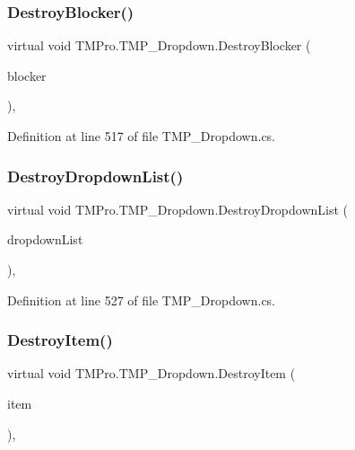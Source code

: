 \subsubsection{\texorpdfstring{DestroyBlocker()}{DestroyBlocker()}}
{\footnotesize\ttfamily virtual void T\+M\+Pro.\+T\+M\+P\+\_\+\+Dropdown.\+Destroy\+Blocker (\begin{DoxyParamCaption}\item[{Game\+Object}]{blocker }\end{DoxyParamCaption})\hspace{0.3cm}{\ttfamily [protected]}, {\ttfamily [virtual]}}



Definition at line 517 of file T\+M\+P\+\_\+\+Dropdown.\+cs.

\mbox{\label{class_t_m_pro_1_1_t_m_p___dropdown_adf7f42bd73c1274367a38b60596f4645}} 
\subsubsection{\texorpdfstring{DestroyDropdownList()}{DestroyDropdownList()}}
{\footnotesize\ttfamily virtual void T\+M\+Pro.\+T\+M\+P\+\_\+\+Dropdown.\+Destroy\+Dropdown\+List (\begin{DoxyParamCaption}\item[{Game\+Object}]{dropdown\+List }\end{DoxyParamCaption})\hspace{0.3cm}{\ttfamily [protected]}, {\ttfamily [virtual]}}



Definition at line 527 of file T\+M\+P\+\_\+\+Dropdown.\+cs.

\mbox{\label{class_t_m_pro_1_1_t_m_p___dropdown_a1a885c39fedfa1f678c50f8d3c4f55b8}} 
\subsubsection{\texorpdfstring{DestroyItem()}{DestroyItem()}}
{\footnotesize\ttfamily virtual void T\+M\+Pro.\+T\+M\+P\+\_\+\+Dropdown.\+Destroy\+Item (\begin{DoxyParamCaption}\item[{\mbox{\hyperlink{class_t_m_pro_1_1_t_m_p___dropdown_1_1_dropdown_item}{Dropdown\+Item}}}]{item }\end{DoxyParamCaption})\hspace{0.3cm}{\ttfamily [protected]}, {\ttfamily [virtual]}}



